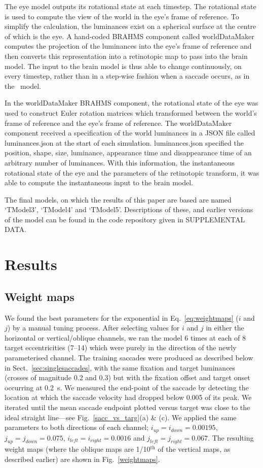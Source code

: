 The eye model outputs its rotational state at each
timestep. The rotational state is used to compute the view of the
world in the eye's frame of reference. To simplify
the calculation, the luminances exist on a spherical surface at the
centre of which is the eye. A hand-coded BRAHMS component called
worldDataMaker computes the projection of the luminances into the
eye's frame of reference and then converts this representation into a
retinotopic map to pass into the brain model. The input to the brain
model is thus able to change continuously, on every timestep, rather
than in a step-wise fashion when a saccade occurs, as in the \ccg~model.

In the worldDataMaker BRAHMS component, the rotational state of the
eye was used to construct Euler rotation matrices which transformed
between the world's frame of reference and the eye's frame of
reference. The worldDataMaker component received a specification of
the world luminances in a JSON file called luminances.json at the
start of each simulation. luminances.json specified the position,
shape, size, luminance, appearance time and disappearance time of an
arbitrary number of luminances. With this information, the
instantaneous rotational state of the eye and the parameters of the
retinotopic transform, it was able to compute the instantaneous input
to the brain model.

The final models, on which the results of this paper are based are
named `TModel3', `TModel4' and `TModel5'. Descriptions of these, and earlier
versions of the model can be
found in the code repository given in SUPPLEMENTAL DATA.


\section{Results}

\subsection{Weight maps}

We found the best parameters for the exponential in Eq.~\ref{eq:weightmaps}
($i$ and $j$) by a manual tuning process. After selecting values for $i$ and $j$
in either the horizontal or vertical/oblique channels, we ran the model 6 times
at each of 8 target eccentricities (7\dg--14\dg) which were purely
in the direction of the
newly parameterised channel. The training saccades were produced as described below in
Sect.~\ref{sec:singlesaccades}, with the same fixation and target luminances
(crosses of magnitude 0.2 and 0.3) but with
the fixation offset and target onset occurring at 0.2~s. We measured the end-point
of the saccade by
detecting the location at which the saccade velocity had dropped below
0.005 of its peak. We iterated until the mean saccade endpoint plotted versus target
was close to the ideal straight line---see Fig.~\ref{sacc_vs_targ}(a) \& (c). We
applied the same parameters to both directions of each channel;
$i_{up} = i_{down} = 0.00195$, $j_{up} = j_{down} = 0.075$,
$i_{left} = i_{right} = 0.0016$ and $j_{left} = j_{right} = 0.067$. The resulting
weight maps (where the oblique maps are 1/10$^{\mathrm{th}}$ of the vertical maps,
as described earlier) are shown in Fig.~\ref{weightmaps}.

